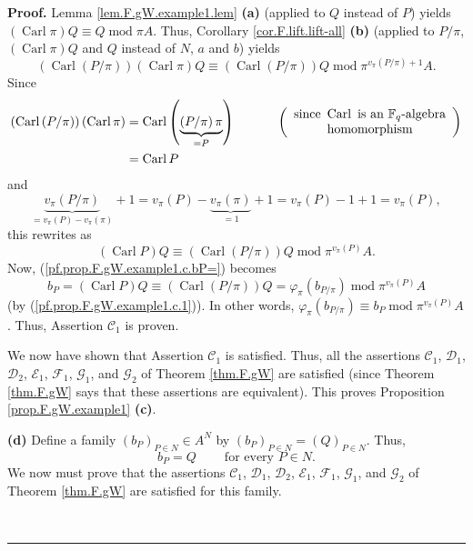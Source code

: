 \documentclass[numbers=enddot,12pt,final,onecolumn,notitlepage]{scrartcl}%
\theoremstyle{definition}
\newenvironment{proof}[1][Proof]{\noindent\textbf{#1.} }{\ \rule{0.5em}{0.5em}}
\begin{document}
\begin{proof}
Lemma \ref{lem.F.gW.example1.lem} \textbf{(a)} (applied to $Q$ instead of $P$)
yields $\left(  \operatorname*{Carl}\pi\right)  Q\equiv Q\operatorname{mod}\pi
A$. Thus, Corollary \ref{cor.F.lift.lift-all} \textbf{(b)} (applied to $P/\pi
$, $\left(  \operatorname*{Carl}\pi\right)  Q$ and $Q$ instead of $N$, $a$ and
$b$) yields%
\[
\left(  \operatorname*{Carl}\left(  P/\pi\right)  \right)  \left(
\operatorname*{Carl}\pi\right)  Q\equiv\left(  \operatorname*{Carl}\left(
P/\pi\right)  \right)  Q\operatorname{mod}\pi^{v_{\pi}\left(  P/\pi\right)
+1}A.
\]
Since%
\begin{align*}
\left(  \operatorname*{Carl}\left(  P/\pi\right)  \right)  \left(
\operatorname*{Carl}\pi\right)   &  =\operatorname*{Carl}\left(
\underbrace{\left(  P/\pi\right)  \pi}_{=P}\right)
\ \ \ \ \ \ \ \ \ \ \left(
\begin{array}
[c]{c}%
\text{since }\operatorname*{Carl}\text{ is an }\mathbb{F}_{q}\text{-algebra}\\
\text{homomorphism}%
\end{array}
\right) \\
&  =\operatorname*{Carl}P
\end{align*}
and
\[
\underbrace{v_{\pi}\left(  P/\pi\right)  }_{=v_{\pi}\left(  P\right)  -v_{\pi
}\left(  \pi\right)  }+1=v_{\pi}\left(  P\right)  -\underbrace{v_{\pi}\left(
\pi\right)  }_{=1}+1=v_{\pi}\left(  P\right)  -1+1=v_{\pi}\left(  P\right)  ,
\]
this rewrites as
\[
\left(  \operatorname*{Carl}P\right)  Q\equiv\left(  \operatorname*{Carl}%
\left(  P/\pi\right)  \right)  Q\operatorname{mod}\pi^{v_{\pi}\left(
P\right)  }A.
\]
Now, (\ref{pf.prop.F.gW.example1.c.bP=}) becomes%
\[
b_{P}=\left(  \operatorname*{Carl}P\right)  Q\equiv\left(
\operatorname*{Carl}\left(  P/\pi\right)  \right)  Q=\varphi_{\pi}\left(
b_{P/\pi}\right)  \operatorname{mod}\pi^{v_{\pi}\left(  P\right)  }A
\]
(by (\ref{pf.prop.F.gW.example1.c.1})). In other words, $\varphi_{\pi}\left(
b_{P/\pi}\right)  \equiv b_{P}\operatorname{mod}\pi^{v_{\pi}\left(  P\right)
}A$. Thus, Assertion $\mathcal{C}_{1}$ is proven.

We now have shown that Assertion $\mathcal{C}_{1}$ is satisfied. Thus, all the
assertions $\mathcal{C}_{1}$, $\mathcal{D}_{1}$, $\mathcal{D}_{2}$,
$\mathcal{E}_{1}$, $\mathcal{F}_{1}$, $\mathcal{G}_{1}$, and $\mathcal{G}_{2}$
of Theorem \ref{thm.F.gW} are satisfied (since Theorem \ref{thm.F.gW} says
that these assertions are equivalent). This proves Proposition
\ref{prop.F.gW.example1} \textbf{(c)}.

\textbf{(d)} Define a family $\left(  b_{P}\right)  _{P\in N}\in A^{N}$ by
$\left(  b_{P}\right)  _{P\in N}=\left(  Q\right)  _{P\in N}$. Thus,%
\begin{equation}
b_{P}=Q\ \ \ \ \ \ \ \ \ \ \text{for every }P\in N.
\label{pf.prop.F.gW.example1.d.bP=}%
\end{equation}
We now must prove that the assertions $\mathcal{C}_{1}$, $\mathcal{D}_{1}$,
$\mathcal{D}_{2}$, $\mathcal{E}_{1}$, $\mathcal{F}_{1}$, $\mathcal{G}_{1}$,
and $\mathcal{G}_{2}$ of Theorem \ref{thm.F.gW} are satisfied for this family.


\end{proof}
\end{document}
